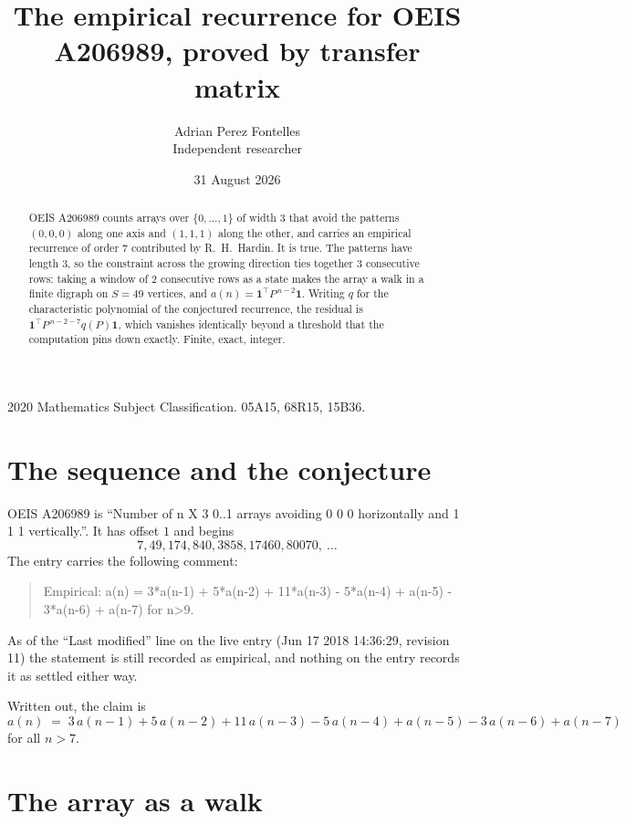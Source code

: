 \documentclass[11pt,a4paper]{article}
\title{The empirical recurrence for OEIS A206989, proved by transfer matrix}
\author{Adrian Perez Fontelles\\ \small Independent researcher}
\date{31 August 2026}
\theoremstyle{plain}
\theoremstyle{definition}
\begin{document}
\maketitle

\begin{abstract}
OEIS A206989 counts arrays over $\{0,\dots,1\}$ of width $3$ that avoid the patterns
$(0,0,0)$ along one axis and $(1,1,1)$ along the other, and carries an empirical recurrence of
order $7$ contributed by R.~H.~Hardin. It is true. The patterns have length $3$, so
the constraint across the growing direction ties together $3$ consecutive rows: taking a
window of $2$ consecutive rows as a state makes the array a walk in a finite digraph
on $S=49$ vertices, and $a(n)=\mathbf{1}^{\!\top}P^{\,n-2}\mathbf{1}$. Writing $q$
for the characteristic polynomial of the conjectured recurrence, the residual is
$\mathbf{1}^{\!\top}P^{\,n-2-7}q(P)\mathbf{1}$, which vanishes identically
beyond a threshold that the computation pins down exactly. Finite, exact, integer.
\end{abstract}

\noindent\small 2020 Mathematics Subject Classification. 05A15, 68R15, 15B36.\normalsize

\section{The sequence and the conjecture}

OEIS A206989 is ``Number of n X 3 0..1 arrays avoiding 0 0 0 horizontally and 1 1 1 vertically.''. It has offset
$1$ and begins
\[
7, 49, 174, 840, 3858, 17460, 80070,\ \dots
\]
The entry carries the following comment:
\begin{quote}\small
Empirical: a(n) = 3*a(n-1) + 5*a(n-2) + 11*a(n-3) - 5*a(n-4) + a(n-5) - 3*a(n-6) + a(n-7) for n>9.
\end{quote}
As of the ``Last modified'' line on the live entry (Jun 17 2018 14:36:29, revision
11) the statement is still recorded as empirical, and nothing on the entry
records it as settled either way.

Written out, the claim is
\begin{equation}\label{eq:conj}
a(n)\;=\;3\,a(n-1) + 5\,a(n-2) + 11\,a(n-3) - 5\,a(n-4) + a(n-5) - 3\,a(n-6) + a(n-7)
\end{equation}
for all $n>7$. 

\section{The array as a walk}
\end{document}
